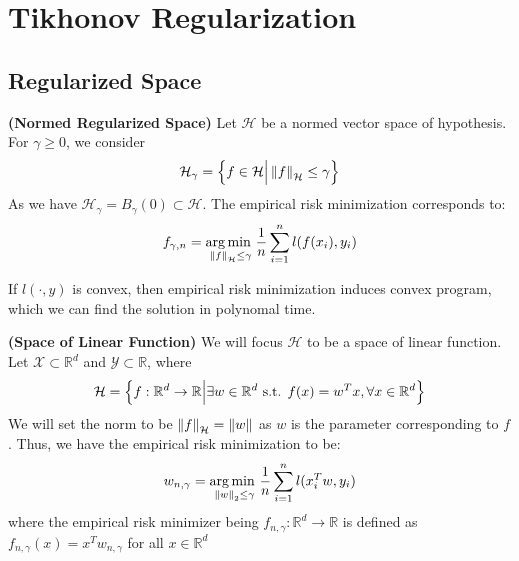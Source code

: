 \section{Tikhonov Regularization}

\subsection{Regularized Space}

\begin{definition}{\textbf{(Normed Regularized Space)}}
    Let $\mathcal{H}$ be a normed vector space of hypothesis. For $\gamma\ge0$, we consider 
    \begin{equation*}
        \mathcal{H}_\gamma = \left\{ f\in\mathcal{H} \Big| \left\lVert f\right\rVert_\mathcal{H}\le \gamma \right\}
    \end{equation*}
    As we have $\mathcal{H}_\gamma = B_\gamma(0)\subset\mathcal{H}$. The empirical risk minimization corresponds to:
    \begin{equation*}
        f_{\gamma, n} = \underset{\left\lVert f\right\rVert_\mathcal{H}\le\gamma}{\arg\min \ }\frac{1}{n}\sum^n_{i=1}l(f(x_i), y_i)
    \end{equation*}
\end{definition}

\begin{remark}
    If $l(\cdot, y)$ is convex, then empirical risk minimization induces convex program, which we can find the solution in polynomal time.
\end{remark}

\begin{definition}{\textbf{(Space of Linear Function)}}
    \label{def:space-lin-funct}
    We will focus $ \mathcal{H} $ to be a space of linear function. Let $\mathcal{X}\subset \mathbb{R}^d$ and $\mathcal{Y}\subset \mathbb{R}$, where 
    \begin{equation*}
        \mathcal{H} = \left\{  f : \mathbb{R}^d \rightarrow \mathbb{R} \Big| \exists w \in \mathbb{R}^d \text{ s.t. } f(x) = w^Tx, \forall x \in \mathbb{R}^d  \right\}
    \end{equation*}
    We will set the norm to be $\left\lVert f\right\rVert_\mathcal{H} = \left\lVert w\right\rVert$ as $w$ is the parameter corresponding to $f$. Thus, we have the empirical risk minimization to be:
    \begin{equation*}
        w_{n,\gamma} = \underset{\left\lVert w\right\rVert_2\le\gamma}{\arg\min \ }\frac{1}{n}\sum^n_{i=1}l(x^T_iw, y_i)
    \end{equation*}
    where the empirical risk minimizer being $f_{n,\gamma} : \mathbb{R}^d\rightarrow \mathbb{R}$ is defined as $f_{n, \gamma}(x) = x^Tw_{n,\gamma}$ for all $x\in \mathbb{R}^d$
\end{definition}

